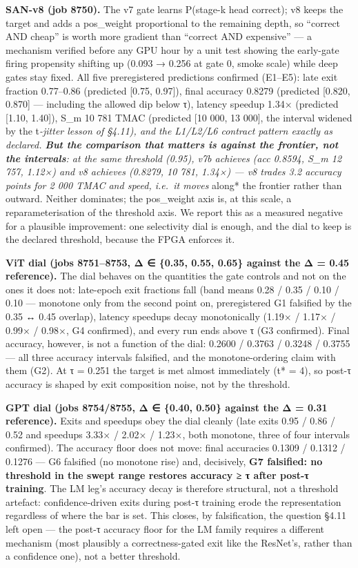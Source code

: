 \documentclass[
]{article}
\begin{document}
\textbf{SAN-v8 (job 8750).} The v7 gate learns P(stage-k head correct);
v8 keeps the target and adds a pos\_weight proportional to the remaining
depth, so ``correct AND cheap'' is worth more gradient than ``correct
AND expensive'' --- a mechanism verified before any GPU hour by a unit
test showing the early-gate firing propensity shifting up (0.093 → 0.256
at gate 0, smoke scale) while deep gates stay fixed. All five
preregistered predictions confirmed (E1--E5): late exit fraction
0.77--0.86 (predicted {[}0.75, 0.97{]}), final accuracy 0.8279
(predicted {[}0.820, 0.870{]} --- including the allowed dip below τ),
latency speedup 1.34× (predicted {[}1.10, 1.40{]}), S\_m 10 781 TMAC
(predicted {[}10 000, 13 000{]}, the interval widened by the
t\emph{-jitter lesson of §4.11), and the L1/L2/L6 contract pattern
exactly as declared. \textbf{But the comparison that matters is against
the frontier, not the intervals}: at the same threshold (0.95), v7b
achieves (acc 0.8594, S\_m 12 757, 1.12×) and v8 achieves (0.8279, 10
781, 1.34×) --- v8 trades 3.2 accuracy points for 2 000 TMAC and speed,
i.e.~it moves }along* the frontier rather than outward. Neither
dominates; the pos\_weight axis is, at this scale, a reparameterisation
of the threshold axis. We report this as a measured negative for a
plausible improvement: one selectivity dial is enough, and the dial to
keep is the declared threshold, because the FPGA enforces it.

\textbf{ViT dial (jobs 8751--8753, Δ ∈ \{0.35, 0.55, 0.65\} against the
Δ = 0.45 reference).} The dial behaves on the quantities the gate
controls and not on the ones it does not: late-epoch exit fractions fall
(band means 0.28 / 0.35 / 0.10 / 0.10 --- monotone only from the second
point on, preregistered G1 falsified by the 0.35 ↔ 0.45 overlap),
latency speedups decay monotonically (1.19× / 1.17× / 0.99× / 0.98×, G4
confirmed), and every run ends above τ (G3 confirmed). Final accuracy,
however, is not a function of the dial: 0.2600 / 0.3763 / 0.3248 /
0.3755 --- all three accuracy intervals falsified, and the
monotone-ordering claim with them (G2). At τ = 0.251 the target is met
almost immediately (t* = 4), so post-τ accuracy is shaped by exit
composition noise, not by the threshold.

\textbf{GPT dial (jobs 8754/8755, Δ ∈ \{0.40, 0.50\} against the Δ =
0.31 reference).} Exits and speedups obey the dial cleanly (late exits
0.95 / 0.86 / 0.52 and speedups 3.33× / 2.02× / 1.23×, both monotone,
three of four intervals confirmed). The accuracy floor does not move:
final accuracies 0.1309 / 0.1312 / 0.1276 --- G6 falsified (no monotone
rise) and, decisively, \textbf{G7 falsified: no threshold in the swept
range restores accuracy ≥ τ after post-τ training}. The LM leg's
accuracy decay is therefore structural, not a threshold artefact:
confidence-driven exits during post-τ training erode the representation
regardless of where the bar is set. This closes, by falsification, the
question §4.11 left open --- the post-τ accuracy floor for the LM family
requires a different mechanism (most plausibly a correctness-gated exit
like the ResNet's, rather than a confidence one), not a better
threshold.
\end{document}
